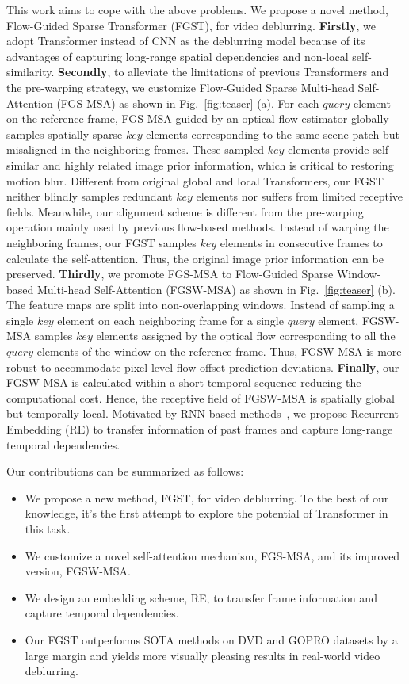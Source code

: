 \documentclass{article}
\begin{document}
	This work aims to cope with the above problems. We propose a novel method, Flow-Guided Sparse Transformer (FGST), for video deblurring. \textbf{Firstly}, we adopt Transformer instead of CNN as the deblurring model because of its advantages of capturing long-range spatial dependencies and non-local self-similarity. \textbf{Secondly}, to alleviate the limitations of previous Transformers and the pre-warping strategy, we customize Flow-Guided Sparse Multi-head Self-Attention (FGS-MSA) as shown in Fig.~\ref{fig:teaser} (a). For each $query$ element on the reference frame, FGS-MSA guided by an optical flow estimator globally samples spatially sparse $key$ elements corresponding to the same scene patch but misaligned in the neighboring frames. These sampled $key$ elements provide self-similar and highly related image prior information, which is critical to restoring motion blur. Different from original global and local Transformers, our FGST neither blindly samples redundant $key$ elements nor suffers from limited receptive fields. Meanwhile, our alignment scheme is different from the pre-warping operation mainly used by previous flow-based methods. Instead of warping the neighboring frames, our FGST samples $key$ elements in consecutive frames to calculate the self-attention. Thus, the original image prior information can be preserved. \textbf{Thirdly}, we  promote FGS-MSA to Flow-Guided Sparse Window-based Multi-head Self-Attention (FGSW-MSA) as shown in Fig.~\ref{fig:teaser} (b). The feature maps are split into non-overlapping windows. Instead of sampling a single $key$ element on each neighboring frame for a single $query$ element, FGSW-MSA samples $key$ elements assigned by the optical flow corresponding to all the $query$ elements of the window on the reference frame. Thus, FGSW-MSA is more robust to accommodate pixel-level flow offset prediction deviations. \textbf{Finally}, our FGSW-MSA is calculated within a short temporal sequence reducing the computational cost. Hence, the receptive field of FGSW-MSA is spatially global but temporally local. Motivated by RNN-based methods~\cite{Nah,RNN_3}, we propose Recurrent Embedding (RE) to transfer information of past frames and capture long-range temporal dependencies.
	
	Our contributions can be summarized as follows:
	
	\begin{itemize}
		\setlength{\itemsep}{1pt}
		\setlength{\parsep}{1pt}
		\setlength{\parskip}{1pt}
		\vspace{-4mm}
		\item We propose a new method, FGST, for video deblurring. To the best of our knowledge, it's the first attempt to explore the potential of Transformer in this task. 
\item We customize a novel self-attention mechanism, FGS-MSA, and its improved version, FGSW-MSA.
\item We design an embedding scheme, RE, to transfer frame information and capture temporal dependencies.
\item Our FGST outperforms SOTA methods on DVD and GOPRO datasets by a large margin and yields more visually pleasing results in real-world video deblurring. 
	\end{itemize}
	
\end{document}
